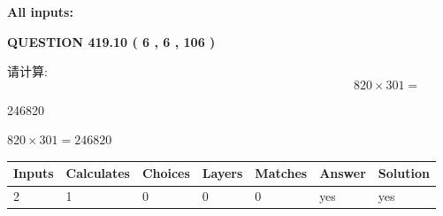 \documentclass{ctexart}
\begin{document}
   
   
   
\noindent{}
   
   
   
   
\noindent\vspace{0.1in}\hspace{-0.08in} {\textbf{\Large{All inputs: }}}
   
   
  
\vspace{0.2in}
  
{\textbf{\Large{QUESTION
419.10 
 ( 6 , 6 , 106 )
}}}
  
  
 
请计算:
\begin{equation}
820  \times    %
301 = \nonumber
\end{equation}
 
 
 
\noindent{}
 
 

246820
 
 
\noindent{}
 
 

 
 
 
\noindent{}
 
 

$ %
820 \times  %
301=   %
246820$
 
 
\noindent{}
 
 

 
   
   
   
   
\noindent\begin{tabular}{|l|l|l|l|l|l|l|}
 \hline
Inputs & Calculates & Choices & Layers & Matches & Answer & Solution \\ \hline
 2  & 
 1  & 
 0
  & 
 0  & 
 0  & 
  yes & 
  yes 
  \\ \hline
 \end{tabular}
   
   
   
   
\noindent{}
   
\end{document}
